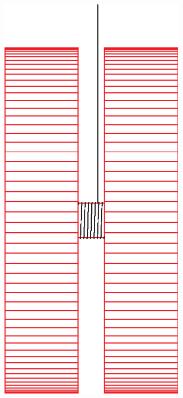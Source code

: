\documentclass[12pt]{article}
\begin{document}
\begin{minipage}{0.20\textwidth}
	\begin{center}
		\includegraphics[width=0.7\textwidth]{red-crop.pdf}
		\end{center}
\end{minipage}
\end{document}
